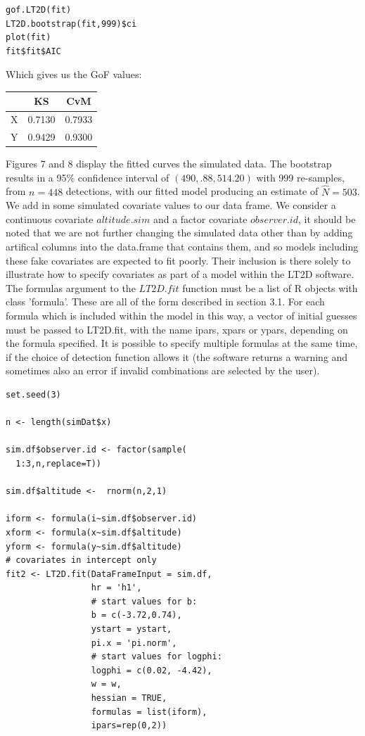 \documentclass[11pt]{article}
\begin{document}
\begin{multicols}{2}
\begingroup
\small
\begin{lstlisting}
gof.LT2D(fit)
LT2D.bootstrap(fit,999)$ci
plot(fit)
fit$fit$AIC
\end{lstlisting}
\endgroup

Which gives us the GoF values:
\begin{center}
 \begin{tabular}{|c c c|} 
 \hline
 \  & KS & CvM \\ [0.5ex] 
 \hline
 X & 0.7130 & 0.7933 \\ 
 \hline
 Y & 0.9429 & 0.9300  \\
 \hline
\end{tabular}
\end{center}


Figures 7 and 8 display the fitted curves the simulated data. The bootstrap results in a 95\% confidence interval of $(490,.88,514.20)$ with 999 re-samples, from $n=448$ detections, with our fitted model producing an estimate of $\hat{N}=503$.  We add in some simulated covariate values to our data frame. We consider a continuous covariate $altitude.sim$ and a factor covariate $observer.id$, it should be noted that we are not further changing the simulated data other than by adding artifical columns into the data.frame that contains them, and so models including these fake covariates are expected to fit poorly. Their inclusion is there solely to illustrate how to specify covariates as part of a model within the LT2D software. The formulas argument to the $LT2D.fit$ function must be a list of R objects with class 'formula'. These are all of the form described in section 3.1. For each formula which is included within the model in this way, a vector of initial guesses must be passed to LT2D.fit, with the name ipars, xpars or ypars, depending on the formula specified. It is possible to specify multiple formulas at the same time, if the choice of detection function allows it (the software returns a warning and sometimes also an error if invalid combinations are selected by the user).

\begingroup
\footnotesize
\begin{lstlisting}
set.seed(3)

n <- length(simDat$x)

sim.df$observer.id <- factor(sample(
  1:3,n,replace=T))

sim.df$altitude <-  rnorm(n,2,1)

iform <- formula(i~sim.df$observer.id)
xform <- formula(x~sim.df$altitude)
yform <- formula(y~sim.df$altitude)
# covariates in intercept only
fit2 <- LT2D.fit(DataFrameInput = sim.df,
                 hr = 'h1',
                 # start values for b:
                 b = c(-3.72,0.74),
                 ystart = ystart,
                 pi.x = 'pi.norm',
                 # start values for logphi:
                 logphi = c(0.02, -4.42),
                 w = w,
                 hessian = TRUE,
                 formulas = list(iform),
                 ipars=rep(0,2))


\end{lstlisting}
\end{multicols}
\end{document}
